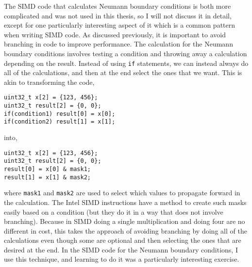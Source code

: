 The SIMD code that calculates Neumann boundary conditions is both more complicated and was not used in this thesis, so I will not discuss it in detail, except for one
particularly interesting aspect of it which is a common pattern when writing SIMD code. As discussed previously, it is important to avoid branching in code to improve
performance. The calculation for the Neumann boundary conditions involves testing a condition and throwing away a calculation depending on the result. Instead of
using \texttt{if} statements, we can instead always do all of the calculations, and then at the end select the ones that we want. This is akin to transforming the
code,
\begin{addmargin}[4em]{2em}%
\begin{singlespace}
\texttt{uint32\_t x[2] = \{123, 456\};}\\
\texttt{uint32\_t result[2] = \{0, 0\};}\\
\texttt{if(condition1) result[0] = x[0];}\\
\texttt{if(condition2) result[1] = x[1];}\\
\end{singlespace}
\end{addmargin}
into,
\begin{addmargin}[4em]{2em}%
\begin{singlespace}
\texttt{uint32\_t x[2] = \{123, 456\};}\\
\texttt{uint32\_t result[2] = \{0, 0\};}\\
\texttt{result[0] = x[0] \& mask1;}\\
\texttt{result[1] = x[1] \& mask2;}\\
\end{singlespace}
\end{addmargin}
where \texttt{mask1} and \texttt{mask2} are used to select which values to propagate forward in the calculation. The Intel SIMD instructions have a method to
create such masks easily based on a condition (but they do it in a way that does not involve branching). Because in SIMD doing a single multiplication and doing
four are no different in cost, this takes the approach of avoiding branching by doing all of the calculations even though some are optional and then selecting the
ones that are desired at the end.
In the SIMD code for the Neumann boundary conditions,
I use this technique, and learning to do it was a particularly interesting exercise.
